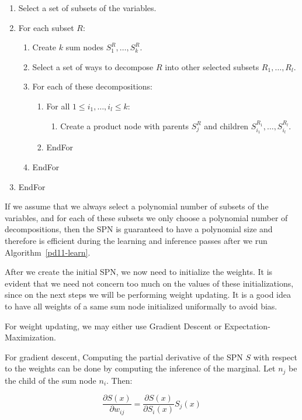 \documentclass[a4paper,10pt]{article}
\theoremstyle{plain}
\begin{document}
\begin{enumerate}
  \item Select a set of subsets of the variables.
  \item For each subset $R$:
  \begin{enumerate}[label*=\arabic*.]
    \item Create $k$ sum nodes $S_1^R,\ldots,S_k^R$.
    \item Select a set of ways to decompose $R$ into other selected subsets $R_1,\ldots,R_l$.
    \item For each of these decompositions:
    \begin{enumerate}[label*=\arabic*.]
      \item For all $1\leq i_1,\ldots,i_l\leq k$:
      \begin{enumerate}[label*=\arabic*.]
        \item Create a product node with parents $S_j^R$ and children $S_{i_1}^{R_1},\ldots,
          S_{i_l}^{R_l}$.
      \end{enumerate}
      \item EndFor
    \end{enumerate}
  \item EndFor
  \end{enumerate}
  \item EndFor
\end{enumerate}

If we assume that we always select a polynomial number of subsets of the variables, and for each of
these subsets we only choose a polynomial number of decompositions, then the SPN is guaranteed to
have a polynomial size and therefore is efficient during the learning and inference passes after
we run Algorithm~\ref{pd11-learn}.

After we create the initial SPN, we now need to initialize the weights. It is evident that we need
not concern too much on the values of these initializations, since on the next steps we will be
performing weight updating. It is a good idea to have all weights of a same sum node initialized
uniformally to avoid bias.

For weight updating, we may either use Gradient Descent or Expectation-Maximization.

For gradient descent, Computing the partial derivative of the SPN $S$ with respect to the weights
can be done by computing the inference of the marginal. Let $n_j$ be the child of the sum node
$n_i$. Then:

\begin{equation*}
  \frac{\partial S(x)}{\partial w_{ij}} = \frac{\partial S(x)}{\partial S_i(x)}S_j(x)
\end{equation*}
\end{document}
